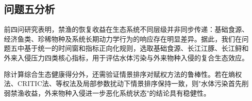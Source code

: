 \subsection{问题五分析}
前四问研究表明，禁渔的恢复收益在生态系统不同层级并非同步传递：基础食源、经济鱼类、珍稀物种及系统长期动力学行为的响应存在明显差异。据此，我们在问题五中基于统一的时间窗和指标正向化规则，选取基础食源、长江江豚、长江鲟和外来入侵压力四类核心指标，用于评估水体污染与外来物种入侵的复合生态效应。

除计算综合生态健康得分外，还需验证情景排序对赋权方法的鲁棒性。若在熵权法、CRITIC法、等权法及局部参数扰动下情景排序保持一致，则"水体污染首先削弱禁渔收益，外来物种入侵进一步恶化系统状态"的结论具有稳健性。

